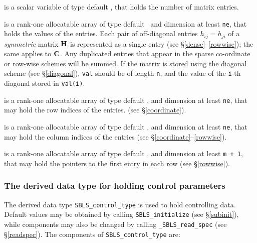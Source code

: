 \documentclass{galahad}
\newcommand{\packagename}{SBLS}
\newcommand{\fullpackagename}{\libraryname\_\packagename}
\begin{document}
\begin{description}
 is a scalar variable of type default \integer, that
holds the number of matrix entries.

 is a rank-one allocatable array of type default \realdp\, 
and dimension at least {\tt ne}, that holds the values of the entries. 
Each pair of off-diagonal entries $h_{ij} = h_{ji}$ of a {\em symmetric}
matrix ${\mathbf{H}}$ is represented as a single entry 
(see \S\ref{dense}--\ref{rowwise}); the same applies to ${\mathbf{C}}$.
Any duplicated entries that appear in the sparse 
co-ordinate or row-wise schemes will be summed. 
If the matrix is stored using the diagonal scheme (see \S\ref{diagonal}),
{\tt val} should be of length {\tt n}, and the value of the {\tt i}-th 
diagonal stored in {\tt val(i)}.

 is a rank-one allocatable array of type default \integer, 
and dimension at least {\tt ne}, that may hold the row indices of the entries. 
(see \S\ref{coordinate}).

 is a rank-one allocatable array of type default \integer, 
and dimension at least {\tt ne}, that may hold the column indices of the entries
(see \S\ref{coordinate}--\ref{rowwise}).

 is a rank-one allocatable array of type default \integer, 
and dimension at least {\tt m + 1}, that may hold the pointers to
the first entry in each row (see \S\ref{rowwise}).

\end{description}

\subsubsection{The derived data type for holding control 
 parameters}\label{typecontrol}
The derived data type 
{\tt \packagename\_control\_type} 
is used to hold controlling data. Default values may be obtained by calling 
{\tt \packagename\_initialize}
(see \S\ref{subinit}),
while components may also be changed by calling 
{\tt \fullpackagename\_read\-\_spec}
(see \S\ref{readspec}). 
The components of 
{\tt \packagename\_control\_type} 
are:
\end{document}
